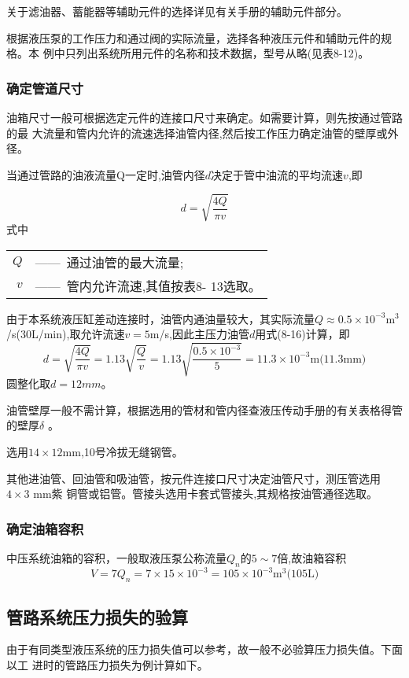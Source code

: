 关于滤油器、蓄能器等辅助元件的选择详见有关手册的辅助元件部分。

根据液压泵的工作压力和通过阀的实际流量，选择各种液压元件和辅助元件的规格。本
例中只列出系统所用元件的名称和技术数据，型号从略(见表8-12)。

\subsubsection*{确定管道尺寸}

油箱尺寸一般可根据选定元件的连接口尺寸来确定。如需要计算，则先按通过管路的最
大流量和管内允许的流速选择油管内径,然后按工作压力确定油管的壁厚或外径。

当通过管路的油液流量Q一定时,油管内径$d$决定于管中油流的平均流速$v$,即

\begin{equation}
d=\sqrt{\frac{4Q}{\pi v}}
\end{equation}
\noindent 式中\
\begin{tabular}[t]{rl}
$Q$&——\ 通过油管的最大流量;\\
$v$&——\ 管内允许流速,其值按表8- 13选取。\\
\end{tabular}

由于本系统液压缸差动连接时，油管内通油量较大，其实际流量$Q\approx 0.5\times 10^{-3} \text{m}^{3}$/s(30L/min),取允许流速$v=5$m/s,因此主压力油管$d$用式(8-16)计算，即
$$
d=\sqrt{\frac{4Q}{\pi v}}=1.13\sqrt{\frac{Q}{v}}=1.13\sqrt{\frac{0.5\times 10^{-3}}{5}}=11.3\times 10^{-3}\text{m(11.3mm)}
$$
圆整化取$d=12mm$。

油管壁厚一般不需计算，根据选用的管材和管内径查液压传动手册的有关表格得管的壁厚$\delta$ 。

选用$14\times12$mm,10号冷拔无缝钢管。

其他进油管、回油管和吸油管，按元件连接口尺寸决定油管尺寸，测压管选用$4\times 3$ mm紫
铜管或铝管。管接头选用卡套式管接头,其规格按油管通径选取。

\subsubsection*{确定油箱容积}
中压系统油箱的容积，一般取液压泵公称流量$Q_n$的$5\sim7$倍,故油箱容积
$$
V=7Q_n=7\times 15\times 10^{-3}=105\times 10^{-3}\text{m}^{3}\text{(105L)}
$$
\subsection{管路系统压力损失的验算}
由于有同类型液压系统的压力损失值可以参考，故一般不必验算压力损失值。下面以工
进时的管路压力损失为例计算如下。

